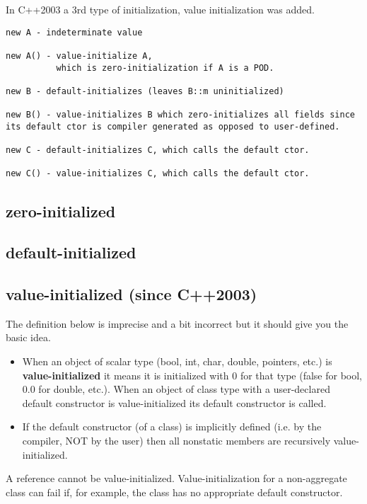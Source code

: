 In C++2003 a 3rd type of initialization, value initialization was added.
\begin{verbatim}
new A - indeterminate value

new A() - value-initialize A, 
          which is zero-initialization if A is a POD.

new B - default-initializes (leaves B::m uninitialized)

new B() - value-initializes B which zero-initializes all fields since its default ctor is compiler generated as opposed to user-defined.

new C - default-initializes C, which calls the default ctor.

new C() - value-initializes C, which calls the default ctor.
\end{verbatim}

\subsection{zero-initialized}

\subsection{default-initialized}

\subsection{value-initialized (since C++2003)}
\label{sec:value-initialized}	


The definition below is imprecise and a bit incorrect but it should give you the
basic idea.
\begin{itemize}
  \item When an object of scalar type (bool, int, char, double, pointers, etc.) is
{\bf value-initialized} it means it is initialized with 0 for that type (false
for bool, 0.0 for double, etc.). When an object of class type with a user-declared
default constructor is value-initialized its default constructor is called.

  \item If the default constructor (of a class) is implicitly defined (i.e. by
  the compiler, NOT by the user) then all nonstatic members are recursively
value-initialized.
\end{itemize}

A reference cannot be value-initialized. Value-initialization for a
non-aggregate class can fail if, for example, the class has no appropriate
default constructor. 




